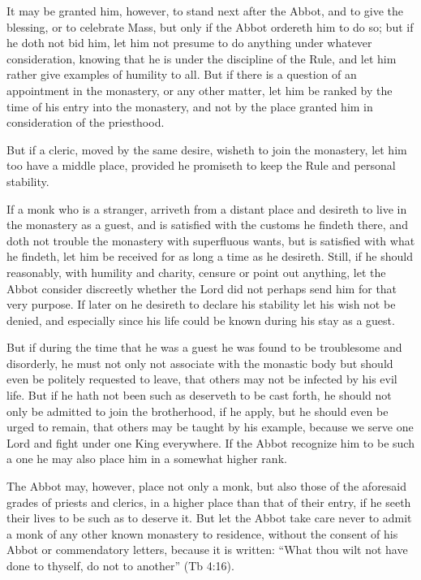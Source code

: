 It may be granted him, however, to stand next after the Abbot, and to give the blessing, or to celebrate Mass, but only if the Abbot ordereth him to do so; but if he doth not bid him, let him not presume to do anything under whatever consideration, knowing that he is under the discipline of the Rule, and let him rather give examples of humility to all. But if there is a question of an appointment in the monastery, or any other matter, let him be ranked by the time of his entry into the monastery, and not by the place granted him in consideration of the priesthood.

But if a cleric, moved by the same desire, wisheth to join the monastery, let him too have a middle place, provided he promiseth to keep the Rule and personal stability.


If a monk who is a stranger, arriveth from a distant place and desireth to live in the monastery as a guest, and is satisfied with the customs he findeth there, and doth not trouble the monastery with superfluous wants, but is satisfied with what he findeth, let him be received for as long a time as he desireth. Still, if he should reasonably, with humility and charity, censure or point out anything, let the Abbot consider discreetly whether the Lord did not perhaps send him for that very purpose. If later on he desireth to declare his stability let his wish not be denied, and especially since his life could be known during his stay as a guest.

But if during the time that he was a guest he was found to be troublesome and disorderly, he must not only not associate with the monastic body but should even be politely requested to leave, that others may not be infected by his evil life. But if he hath not been such as deserveth to be cast forth, he should not only be admitted to join the brotherhood, if he apply, but he should even be urged to remain, that others may be taught by his example, because we serve one Lord and fight under one King everywhere. If the Abbot recognize him to be such a one he may also place him in a somewhat higher rank.

The Abbot may, however, place not only a monk, but also those of the aforesaid grades of priests and clerics, in a higher place than that of their entry, if he seeth their lives to be such as to deserve it. But let the Abbot take care never to admit a monk of any other known monastery to residence, without the consent of his Abbot or commendatory letters, because it is written: ``What thou wilt not have done to thyself, do not to another'' (Tb 4:16).

